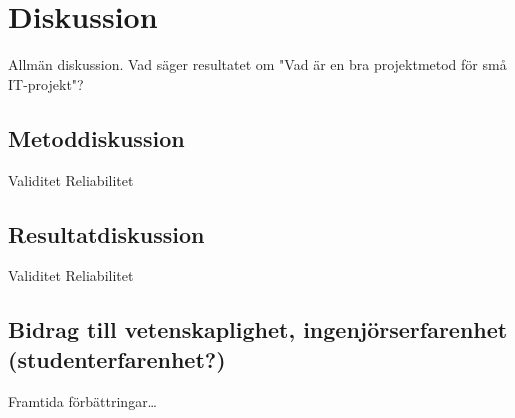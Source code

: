
\section{Diskussion}
Allmän diskussion. Vad säger resultatet om "Vad är en bra projektmetod för små IT-projekt"?

\subsection{Metoddiskussion}
Validitet
Reliabilitet

\subsection{Resultatdiskussion}
Validitet
Reliabilitet

\subsection{Bidrag till vetenskaplighet, ingenjörserfarenhet (studenterfarenhet?)}
Framtida förbättringar\dots
